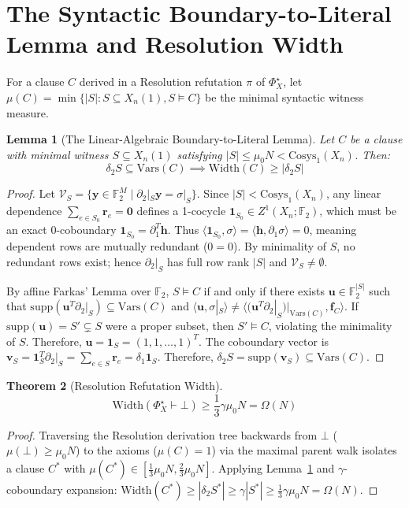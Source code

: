 \documentclass[11pt,a4paper]{article}
\newtheorem{theorem}{Theorem}[section]
\newtheorem{lemma}[theorem]{Lemma}
\theoremstyle{definition}
\newcommand{\Width}{\mathrm{Width}}
\newcommand{\Cosys}{\mathrm{Cosys}}
\newcommand{\supp}{\mathrm{supp}}
\newcommand{\Vars}{\mathrm{Vars}}
\begin{document}
\section{The Syntactic Boundary-to-Literal Lemma and Resolution Width}
For a clause $C$ derived in a Resolution refutation $\pi$ of $\Phi_X^\star$, let $\mu(C) = \min \{ |S| : S \subseteq X_n(1), S \models C \}$ be the minimal syntactic witness measure.

\begin{lemma}[The Linear-Algebraic Boundary-to-Literal Lemma]\label{lem:boundary}
Let $C$ be a clause with minimal witness $S \subseteq X_n(1)$ satisfying $|S| \le \mu_0 N < \Cosys_1(X_n)$. Then:
$$\delta_2 S \subseteq \Vars(C) \implies \Width(C) \ge |\delta_2 S|$$
\end{lemma}
\begin{proof}
Let $\mathcal{V}_S = \{ \mathbf{y} \in \mathbb{F}_2^M \mid \partial_2|_S \mathbf{y} = \sigma|_S \}$.
Since $|S| < \Cosys_1(X_n)$, any linear dependence $\sum_{e \in S_0} \mathbf{r}_e = \mathbf{0}$ defines a 1-cocycle $\mathbf{1}_{S_0} \in Z^1(X_n; \mathbb{F}_2)$, which must be an exact 0-coboundary $\mathbf{1}_{S_0} = \partial_1^T \mathbf{h}$.
Thus $\langle \mathbf{1}_{S_0}, \sigma \rangle = \langle \mathbf{h}, \partial_1 \sigma \rangle = 0$, meaning dependent rows are mutually redundant ($0=0$).
By minimality of $S$, no redundant rows exist; hence $\partial_2|_S$ has full row rank $|S|$ and $\mathcal{V}_S \neq \emptyset$.

By affine Farkas' Lemma over $\mathbb{F}_2$, $S \models C$ if and only if there exists $\mathbf{u} \in \mathbb{F}_2^{|S|}$ such that $\supp(\mathbf{u}^T \partial_2|_S) \subseteq \Vars(C)$ and $\langle \mathbf{u}, \sigma|_S \rangle \neq \langle (\mathbf{u}^T \partial_2|_S)|_{\Vars(C)}, \mathbf{f}_C \rangle$.
If $\supp(\mathbf{u}) = S' \subsetneq S$ were a proper subset, then $S' \models C$, violating the minimality of $S$.
Therefore, $\mathbf{u} = \mathbf{1}_S = (1, 1, \dots, 1)^T$.
The coboundary vector is $\mathbf{v}_S = \mathbf{1}_S^T \partial_2|_S = \sum_{e \in S} \mathbf{r}_e = \delta_1 \mathbf{1}_S$.
Therefore, $\delta_2 S = \supp(\mathbf{v}_S) \subseteq \Vars(C)$.
\end{proof}

\begin{theorem}[Resolution Refutation Width]\label{thm:width}
$$\Width(\Phi_X^\star \vdash \bot) \ge \frac{1}{3}\gamma \mu_0 N = \Omega(N)$$
\end{theorem}
\begin{proof}
Traversing the Resolution derivation tree backwards from $\bot$ ($\mu(\bot) \ge \mu_0 N$) to the axioms ($\mu(C) = 1$) via the maximal parent walk isolates a clause $C^*$ with $\mu(C^*) \in [\frac{1}{3}\mu_0 N, \frac{2}{3}\mu_0 N]$.
Applying Lemma~\ref{lem:boundary} and $\gamma$-coboundary expansion:
$\Width(C^*) \ge |\delta_2 S^*| \ge \gamma |S^*| \ge \frac{1}{3}\gamma \mu_0 N = \Omega(N)$.
\end{proof}
\end{document}

